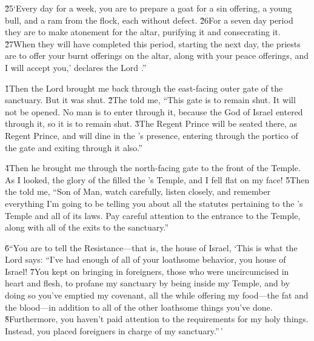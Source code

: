 \v{25}`Every day for a week, you are to prepare a goat for a sin offering, a young bull, and a ram from the flock, each without defect. \v{26}For a seven day period they are to make atonement for the altar, purifying it and consecrating it. \v{27}When they will have completed this period, starting the next day, the priests are to offer your burnt offerings on the altar, along with your peace offerings, and I will accept you,' declares the Lord .''

\v{1}Then the Lord  brought me back through the east-facing outer gate of the sanctuary. But it was shut. \v{2}The  told me, ``This gate is to remain shut. It will not be opened. No man is to enter through it, because the  God of Israel entered through it, so it is to remain shut. \v{3}The Regent Prince will be seated there, as Regent Prince, and will dine in the 's presence, entering through the portico of the gate and exiting through it also.''

\v{4}Then he brought me through the north-facing gate to the front of the Temple. As I looked, the glory of the  filled the 's Temple, and I fell flat on my face! \v{5}Then the  told me, ``Son of Man, watch carefully, listen closely, and remember everything I'm going to be telling you about all the statutes pertaining to the 's Temple and all of its laws. Pay careful attention to the entrance to the Temple, along with all of the exits to the sanctuary.''

\v{6}``You are to tell the Resistance---that is, the house of Israel, `This is what the Lord  says: ``I've had enough of all of your loathsome behavior, you house of Israel! \v{7}You kept on bringing in foreigners, those who were uncircumcised in heart and flesh, to profane my sanctuary by being inside my Temple, and by doing so you've emptied my covenant, all the while offering my food---the fat and the blood---in addition to all of the other loathsome things you've done. \v{8}Furthermore, you haven't paid attention to the requirements for my holy things. Instead, you placed foreigners in charge of my sanctuary.''\,'

